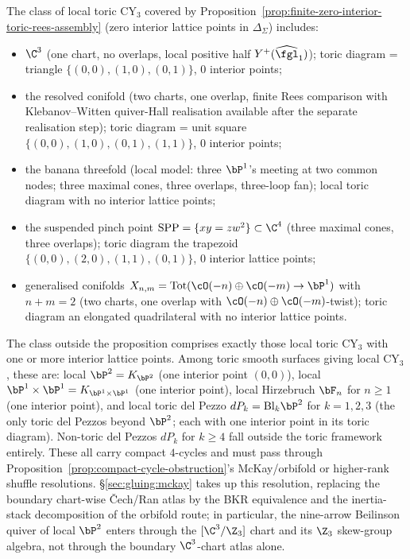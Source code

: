The class of local toric CY$_3$ covered by
Proposition~\ref{prop:finite-zero-interior-toric-rees-assembly} (zero interior lattice
points in $\Delta_\Sigma$) includes:
\begin{itemize}
\item $\C^3$ (one chart, no overlaps, local positive half
 $Y^+(\widehat{\fgl}_1)$); toric diagram =
 triangle $\{(0,0), (1,0), (0,1)\}$, $0$ interior points;
\item the resolved conifold (two charts, one overlap,
 finite Rees comparison with Klebanov--Witten quiver-Hall realisation
 available after the separate realisation step); toric diagram = unit
 square $\{(0,0), (1,0), (0,1), (1,1)\}$, $0$ interior points;
\item the banana threefold (local model: three $\bP^1$'s meeting at two
 common nodes; three maximal cones, three overlaps, three-loop fan);
 local toric diagram with no interior lattice points;
\item the suspended pinch point $\mathrm{SPP} = \{xy = zw^2\} \subset
 \C^4$ (three maximal cones, three overlaps); toric diagram the
 trapezoid $\{(0,0), (2,0), (1,1), (0,1)\}$, $0$ interior lattice points;
\item generalised conifolds $X_{n, m} = \mathrm{Tot}(\cO(-n) \oplus
 \cO(-m) \to \bP^1)$ with $n + m = 2$ (two charts, one overlap with
 $\cO(-n) \oplus \cO(-m)$-twist); toric diagram an elongated
 quadrilateral with no interior lattice points.
\end{itemize}

The class outside the proposition comprises exactly those local
toric CY$_3$ with one or more interior lattice points. Among toric
smooth surfaces giving local CY$_3$, these are: local $\bP^2 = K_{\bP^2}$
(one interior point $(0,0)$), local $\bP^1 \times \bP^1 = K_{\bP^1
\times \bP^1}$ (one interior point), local Hirzebruch $\bF_n$ for
$n \geq 1$ (one interior point), and local toric del Pezzo
$dP_k = \mathrm{Bl}_k \bP^2$ for $k = 1, 2, 3$ (the only toric del
Pezzos beyond $\bP^2$; each with one interior point in its toric
diagram). Non-toric del Pezzos $dP_k$ for $k \geq 4$ fall outside the
toric framework entirely. These all carry compact $4$-cycles and must
pass through Proposition~\ref{prop:compact-cycle-obstruction}'s
McKay/orbifold or higher-rank shuffle resolutions. \S\ref{sec:gluing:mckay} takes up
this resolution, replacing the boundary chart-wise \v{C}ech/Ran atlas by the
BKR equivalence and the inertia-stack decomposition of the orbifold
route; in particular, the nine-arrow Beilinson quiver of local $\bP^2$
enters through the $[\C^3/\Z_3]$ chart and its $\Z_3$ skew-group algebra,
not through the boundary $\C^3$-chart atlas alone.

